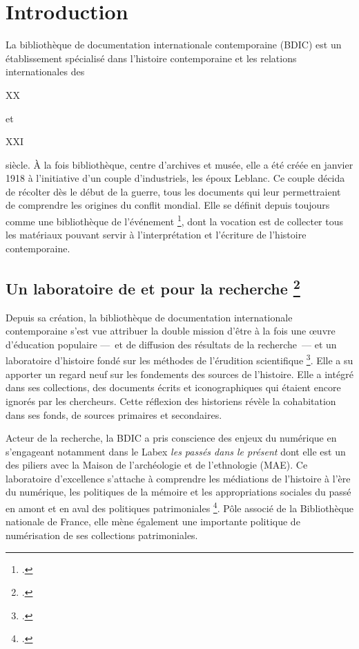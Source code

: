 \documentclass[12pt,a4paper]{book} %
\begin{document}
\clearpage
\thispagestyle{empty}
\cleardoublepage

\chapter*{Introduction}

La bibliothèque de documentation internationale contemporaine (BDIC) est un établissement spécialisé dans l'histoire contemporaine et les relations internationales des \begin{scriptsize}XX\end{scriptsize}\ieme{} et \begin{scriptsize}XXI\end{scriptsize}\ieme{} siècle. À la fois bibliothèque, centre d'archives et musée, elle a été créée en janvier 1918 à  l'initiative d'un couple d'industriels, les époux Leblanc. Ce couple  décida de récolter dès le début de la guerre, tous les documents qui leur permettraient de comprendre les origines du conflit mondial. Elle se définit depuis toujours comme une \og bibliothèque de l'événement \fg{}\footcite{domenach_reflexion_1998}, dont la vocation est de collecter tous les matériaux pouvant servir à l'interprétation et l'écriture de l'histoire contemporaine.

\section*{\og Un laboratoire de et pour la recherche \fg{}\footcite{tesniere_laboratoire_2015}}

Depuis sa création, la bibliothèque de documentation internationale contemporaine s'est vue attribuer la double mission d'être à la fois \og une œuvre d'éducation populaire ---~et de diffusion des résultats de la recherche~--- \fg{} et un \og laboratoire d'histoire fondé sur les méthodes de l'érudition scientifique \fg{}\footcite{_recherche_????}. Elle a su apporter un regard neuf sur les fondements  des sources de l'histoire. Elle a intégré dans ses collections, des documents écrits et iconographiques qui étaient encore ignorés par les chercheurs. Cette réflexion des historiens révèle la cohabitation dans ses fonds, de sources primaires et secondaires.

Acteur de la recherche, la BDIC a pris conscience des enjeux du numérique en s'engageant notamment dans le Labex \textit{les passés dans le présent} dont elle est un des piliers avec la Maison de l'archéologie et de l'ethnologie (MAE). Ce laboratoire d'excellence s'attache \og à comprendre les médiations de l'histoire à l'ère du numérique, les politiques de la mémoire et les appropriations sociales du passé en amont et en aval des politiques patrimoniales \fg{}\footcite{_les_????}. Pôle associé de la Bibliothèque nationale de France, elle mène également une importante politique de numérisation de ses collections patrimoniales.
\end{document}
